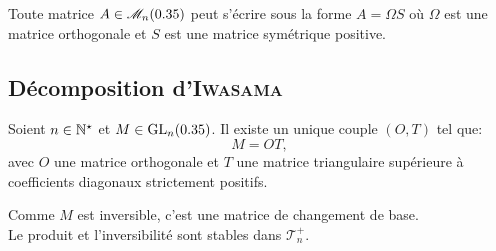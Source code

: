 \begin{corol}
    Toute matrice $A \in \mathscr{M}_n(0.35)$ peut s'écrire sous la forme $A = \Omega S$ où $\Omega$ est une matrice orthogonale et $S$ est une matrice symétrique positive.
\end{corol}

\subsection{Décomposition d'\textsc{Iwasama}}
\begin{theo}{}
    Soient $n \in \mathbb{N}^\star$ et $M \in \mathrm{GL}_n(0.35)$. Il existe un unique couple $(O, T)$ tel que:
    $$M = OT,$$
    avec $O$ une matrice orthogonale et $T$ une matrice triangulaire supérieure à coefficients diagonaux strictement positifs.
\end{theo}
Comme $M$ est inversible, c'est une matrice de changement de base. \\
Le produit et l'inversibilité sont stables dans $\mathscr{T}_n^+$.
